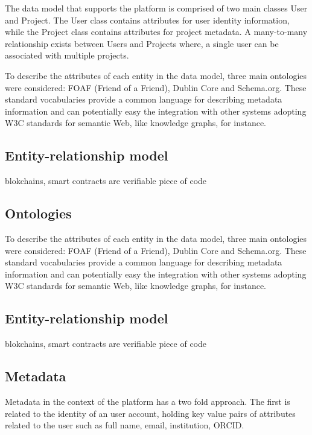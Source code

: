 \documentclass{article}
\begin{document}
The data model that supports the platform is comprised of two main classes User and Project. The User class contains attributes for user identity information, while the Project class contains attributes for project metadata. A many-to-many relationship exists between Users and Projects where, a single user can be associated with multiple projects.

To describe the attributes of each entity in the data model, three main ontologies were considered: FOAF (Friend of a Friend), Dublin Core and Schema.org. These standard vocabularies provide a common language for describing metadata information and can potentially easy the integration with other systems adopting W3C standards for semantic Web, like knowledge graphs, for instance.

\subsection{Entity-relationship model}


blokchains, smart contracts are verifiable piece of code

\subsection{Ontologies}

To describe the attributes of each entity in the data model, three main ontologies were considered: FOAF (Friend of a Friend), Dublin Core and Schema.org. These standard vocabularies provide a common language for describing metadata information and can potentially easy the integration with other systems adopting W3C standards for semantic Web, like knowledge graphs, for instance.

\subsection{Entity-relationship model}


blokchains, smart contracts are verifiable piece of code


\subsection{Metadata}

Metadata in the context of the platform has a two fold approach. The first is related to the identity of an user account, holding key value pairs of attributes related to the user such as full name, email, institution, ORCID.
\end{document}
